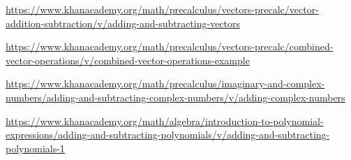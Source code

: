 \begin{readinessAssuranceResources}
\item \url{https://www.khanacademy.org/math/precalculus/vectors-precalc/vector-addition-subtraction/v/adding-and-subtracting-vectors}
\item \url{https://www.khanacademy.org/math/precalculus/vectors-precalc/combined-vector-operations/v/combined-vector-operations-example}
\item \url{https://www.khanacademy.org/math/precalculus/imaginary-and-complex-numbers/adding-and-subtracting-complex-numbers/v/adding-complex-numbers}
\item \url{https://www.khanacademy.org/math/algebra/introduction-to-polynomial-expressions/adding-and-subtracting-polynomials/v/adding-and-subtracting-polynomials-1}
\end{readinessAssuranceResources}
